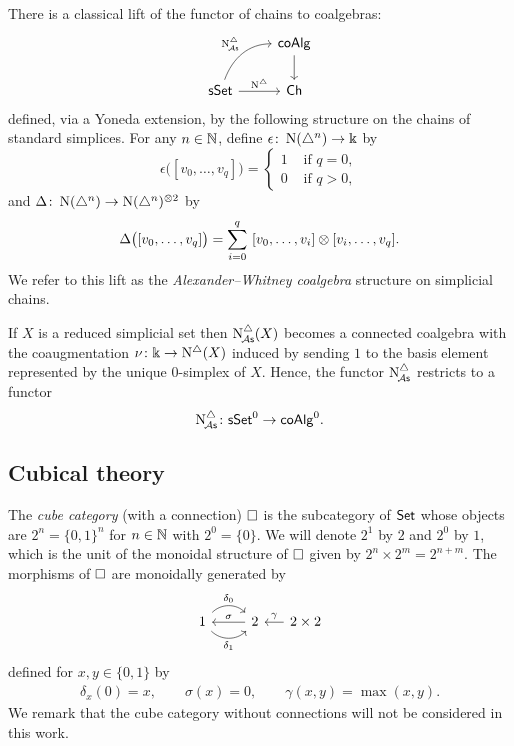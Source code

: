 There is a classical lift of the functor of chains to coalgebras:
\[
\begin{tikzcd}
	& \coAlg \arrow[d] \\
	\sSet \arrow[r, "\schains"] \arrow[ur, "\schainsA", out=70, in=180] & \Ch
\end{tikzcd}
\]
defined, via a Yoneda extension, by the following structure on the chains of standard simplices.
For any $n \in \mathbb{N}$, define $\epsilon \colon \operatorname{N}(\triangle^n) \to \Bbbk$ by
\[
\epsilon \big( [v_0, \dots, v_q] \big) = \begin{cases} 1 & \text{ if } q = 0, \\ 0 & \text{ if } q>0, \end{cases}
\]
and $\Delta \colon \operatorname{N}(\triangle^n) \to \operatorname{N}(\triangle^n)^{\otimes2}$ by
\[
\Delta \big( [v_0, \dots, v_q] \big) = \sum_{i=0}^q \ [v_0, \dots, v_i] \otimes [v_i, \dots, v_q].
\]
We refer to this lift as the \textit{Alexander--Whitney coalgebra} structure on simplicial chains.

If $X$ is a reduced simplicial set then $\operatorname{N^{\triangle}_{\!{\mathcal{A}\mathsf{s}}}}(X)$ becomes a connected coalgebra with the coaugmentation $\nu \colon \Bbbk \to \operatorname{N^{\triangle}}(X)$ induced by sending $1$ to the basis element represented by the unique $0$-simplex of $X$.
Hence, the functor $\operatorname{N^{\triangle}_{\!{\mathcal{A}\mathsf{s}}}}$ restricts to a functor
\[
\operatorname{N^{\triangle}_{\!{\mathcal{A}\mathsf{s}}}} \colon \mathsf{sSet}^0 \to \mathsf{coAlg}^0.
\]

\subsection{Cubical theory}\label{ss:cubical}

The \textit{cube category} (with a connection) $\square$ is the subcategory of $\mathsf{Set}$ whose objects are $2^n = \{0, 1\}^n$ for $n \in \mathbb{N}$ with $2^0 = \{0\}$.
We will denote $2^1$ by $2$ and $2^0$ by $1$, which is the unit of the monoidal structure of $\square$ given by $2^n \times 2^m = 2^{n+m}$.
The morphisms of $\square$ are monoidally generated by
\[
\begin{tikzcd}
	1 \arrow[r, out=45, in=135, "\delta_0"] \arrow[r, out=-45, in=-135, "\delta_1"'] & 2 \arrow[l, "\sigma"'] &[-10pt] \arrow[l, "\gamma"'] 2 \times 2
\end{tikzcd}
\]
defined for $x, y \in \{0,1\}$ by
\begin{gather*}
	\delta_x(0) = x, \qquad
	\sigma(x) = 0, \qquad
	\gamma(x,y) = \max(x,y).
\end{gather*}
We remark that the cube category without connections will not be considered in this work.

